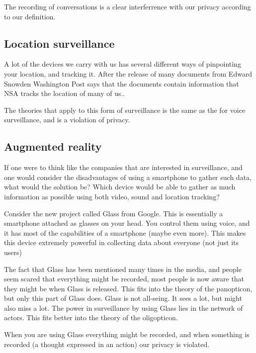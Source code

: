 The recording of conversations is a clear interferrence with our privacy according to our definition.

\subsection{Location surveillance}
A lot of the devices we carry with us has several different ways of pinpointing your location, and tracking it. After the release of many documents from Edward Snowden Washington Post says that the documents contain information that NSA tracks the location of many of us.\cite{website:nsa-track}.

The theories that apply to this form of surveillance is the same as the for voice surveillance, and is a violation of privacy.

\subsection{Augmented reality}
If one were to think like the companies that are interested in surveillance, and one would consider the disadvantages of using a smartphone to gather such data, what would the solution be? Which device would be able to gather as much information as possible using both video, sound and location tracking?

Consider the new project called Glass from Google. This is essentially a smartphone attached as glasses on your head. You control them using voice, and it has most of the capabilities of a smartphone (maybe even more). This makes this device extremely powerful in collecting data about everyone (not just its users)\cite{website:google-glass}

The fact that Glass has been mentioned many times in the media, and people seem scared that everything might be recorded, most people is now aware that they might be when Glass is released. This fits into the theory of the panopticon, but only this part of Glass does. Glass is not all-seing. It sees a lot, but might also miss a lot. The power in surveillance by using Glass lies in the network of actors. This fits better into the theory of the oligopticon.\cite{website:glass-fears}

When you are using Glass everything might be recorded, and when something is recorded (a thought expressed in an action) our privacy is violated.
